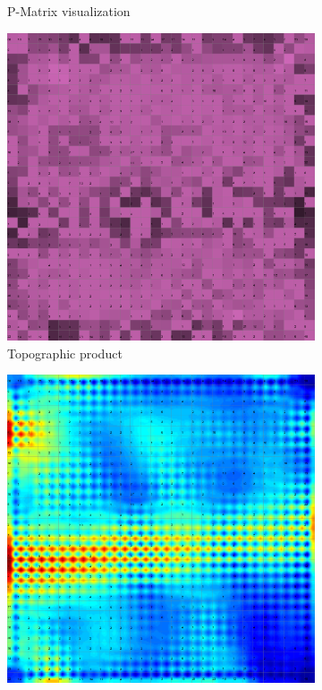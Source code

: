 \documentclass{acm_proc_article-sp}
\begin{document}
\begin{figure}
\begin{subfigure}[b]{0.45\linewidth}
    \caption{P-Matrix visualization}
    \label{fig:wine-big-p-matrix}
\end{subfigure}
\begin{subfigure}[b]{0.45\linewidth}
    \includegraphics[width=\linewidth]{img/wine-big-topo-product}
    \caption{Topographic product}
    \label{fig:wine-big-topo-product}
\end{subfigure}
\begin{subfigure}[b]{0.45\linewidth}
    \includegraphics[width=\linewidth]{img/wine-big-u-matrix}

\end{subfigure}
\end{figure}
\end{document}
